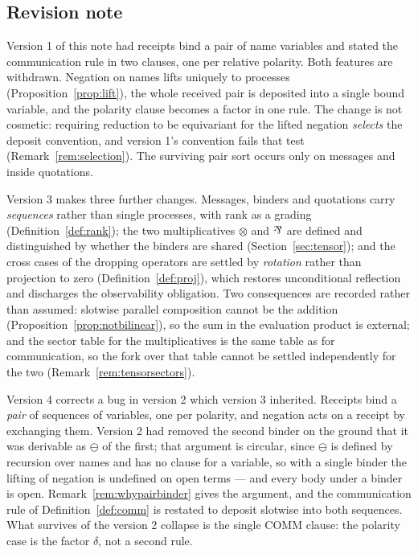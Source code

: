 \documentclass[11pt]{article}
\theoremstyle{definition}
\theoremstyle{remark}
\newcommand{\negop}{\ensuremath{\ominus}}
\newcommand{\parr}{\mathbin{\rotatebox[origin=c]{180}{\&}}}
\begin{document}
\subsection{Revision note}

Version 1 of this note had receipts bind a pair of name variables and stated the
communication rule in two clauses, one per relative polarity. Both features are
withdrawn. Negation on names lifts uniquely to processes
(Proposition~\ref{prop:lift}), the whole received pair is deposited into a single
bound variable, and the polarity clause becomes a factor in one rule. The change
is not cosmetic: requiring reduction to be equivariant for the lifted negation
\emph{selects} the deposit convention, and version 1's convention fails that
test (Remark~\ref{rem:selection}). The surviving pair sort occurs only on
messages and inside quotations.

Version 3 makes three further changes. Messages, binders and quotations carry
\emph{sequences} rather than single processes, with rank as a grading
(Definition~\ref{def:rank}); the two multiplicatives $\otimes$ and $\parr$ are
defined and distinguished by whether the binders are shared
(Section~\ref{sec:tensor}); and the cross cases of the dropping operators are
settled by \emph{rotation} rather than projection to zero
(Definition~\ref{def:proj}), which restores unconditional reflection and
discharges the observability obligation. Two consequences are recorded rather
than assumed: slotwise parallel composition cannot be the addition
(Proposition~\ref{prop:notbilinear}), so the sum in the evaluation product is
external; and the sector table for the multiplicatives is the same table as for
communication, so the fork over that table cannot be settled independently for
the two (Remark~\ref{rem:tensorsectors}).

Version 4 corrects a bug in version 2 which version 3 inherited. Receipts bind a
\emph{pair} of sequences of variables, one per polarity, and negation acts on a
receipt by exchanging them. Version 2 had removed the second binder on the
ground that it was derivable as $\negop$ of the first; that argument is
circular, since $\negop$ is defined by recursion over names and has no clause for
a variable, so with a single binder the lifting of negation is undefined on open
terms --- and every body under a binder is open. Remark~\ref{rem:whypairbinder}
gives the argument, and the communication rule of Definition~\ref{def:comm} is
restated to deposit slotwise into both sequences. What survives of the version 2
collapse is the single COMM clause: the polarity case is the factor $\delta$,
not a second rule.
\end{document}
